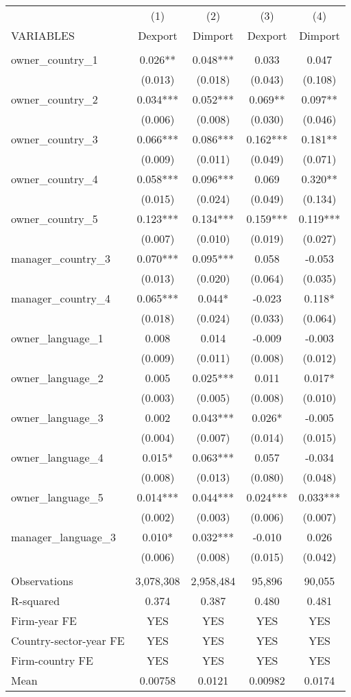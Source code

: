 \begin{tabular}{lcccc} \hline
 & (1) & (2) & (3) & (4) \\
VARIABLES & Dexport & Dimport & Dexport & Dimport \\ \hline
 &  &  &  &  \\
owner\_country\_1 & 0.026** & 0.048*** & 0.033 & 0.047 \\
 & (0.013) & (0.018) & (0.043) & (0.108) \\
owner\_country\_2 & 0.034*** & 0.052*** & 0.069** & 0.097** \\
 & (0.006) & (0.008) & (0.030) & (0.046) \\
owner\_country\_3 & 0.066*** & 0.086*** & 0.162*** & 0.181** \\
 & (0.009) & (0.011) & (0.049) & (0.071) \\
owner\_country\_4 & 0.058*** & 0.096*** & 0.069 & 0.320** \\
 & (0.015) & (0.024) & (0.049) & (0.134) \\
owner\_country\_5 & 0.123*** & 0.134*** & 0.159*** & 0.119*** \\
 & (0.007) & (0.010) & (0.019) & (0.027) \\
manager\_country\_3 & 0.070*** & 0.095*** & 0.058 & -0.053 \\
 & (0.013) & (0.020) & (0.064) & (0.035) \\
manager\_country\_4 & 0.065*** & 0.044* & -0.023 & 0.118* \\
 & (0.018) & (0.024) & (0.033) & (0.064) \\
owner\_language\_1 & 0.008 & 0.014 & -0.009 & -0.003 \\
 & (0.009) & (0.011) & (0.008) & (0.012) \\
owner\_language\_2 & 0.005 & 0.025*** & 0.011 & 0.017* \\
 & (0.003) & (0.005) & (0.008) & (0.010) \\
owner\_language\_3 & 0.002 & 0.043*** & 0.026* & -0.005 \\
 & (0.004) & (0.007) & (0.014) & (0.015) \\
owner\_language\_4 & 0.015* & 0.063*** & 0.057 & -0.034 \\
 & (0.008) & (0.013) & (0.080) & (0.048) \\
owner\_language\_5 & 0.014*** & 0.044*** & 0.024*** & 0.033*** \\
 & (0.002) & (0.003) & (0.006) & (0.007) \\
manager\_language\_3 & 0.010* & 0.032*** & -0.010 & 0.026 \\
 & (0.006) & (0.008) & (0.015) & (0.042) \\
 &  &  &  &  \\
Observations & 3,078,308 & 2,958,484 & 95,896 & 90,055 \\
R-squared & 0.374 & 0.387 & 0.480 & 0.481 \\
Firm-year FE & YES & YES & YES & YES \\
Country-sector-year FE & YES & YES & YES & YES \\
Firm-country FE & YES & YES & YES & YES \\
 Mean & 0.00758 & 0.0121 & 0.00982 & 0.0174 \\ \hline
\end{tabular}
